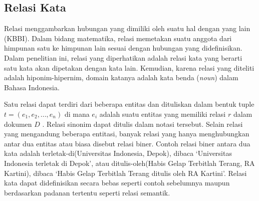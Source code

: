 \subsection{Relasi Kata}
Relasi menggambarkan hubungan yang dimiliki oleh suatu hal dengan yang lain (KBBI). Dalam bidang matematika, relasi memetakan suatu anggota dari himpunan satu ke himpunan lain sesuai dengan hubungan yang didefinisikan. Dalam penelitian ini, relasi yang diperhatikan adalah relasi kata yang berarti satu kata akan dipetakan dengan kata lain. Kemudian, karena relasi yang diteliti adalah hiponim-hipernim, domain katanya adalah kata benda (\textit{noun}) dalam Bahasa Indonesia.

Satu relasi dapat terdiri dari beberapa entitas dan dituliskan dalam bentuk tuple $t = (e_1, e_2, ..., e_n)$ di mana $e_i$ adalah suatu entitas yang memiliki relasi $r$ dalam dokumen $D$ \citep{bach2007review}. Relasi sinonim dapat ditulis dalam notasi tersebut. Selain relasi yang mengandung beberapa entitasi, banyak relasi yang hanya menghubungkan antar dua entitas atau biasa disebut relasi biner. Contoh relasi biner antara dua kata adalah terletak-di(Universitas Indonesia, Depok), dibaca `Universitas Indonesia terletak di Depok', atau ditulis-oleh(Habis Gelap Terbitlah Terang, RA Kartini), dibaca `Habis Gelap Terbitlah Terang ditulis oleh RA Kartini'. Relasi kata dapat didefinisikan secara bebas seperti contoh sebelumnya maupun berdasarkan padanan tertentu seperti relasi semantik.

